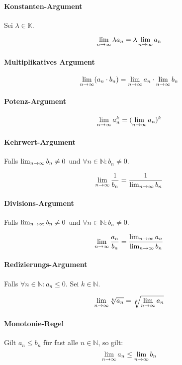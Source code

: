         \paragraph{Konstanten-Argument}
            Sei $ \lambda \in \mathbb{K} $.

            \[ \lim_{n \to \infty} \lambda a _ n = \lambda \lim_{n \to \infty} a _ n \]

        \paragraph{Multiplikatives Argument}
            \[ \lim_{n \to \infty} (a _ n \cdot b _ n) = \lim_{n \to \infty} a _ n \cdot \lim_{n \to \infty} b _ n \]

        \paragraph{Potenz-Argument}
            \[ \lim_{n \to \infty} a _ n ^ k = (\lim_{n \to \infty} a _ n) ^ k \]

        \paragraph{Kehrwert-Argument}
            Falls $ \lim_{n \to \infty} b _ n \neq 0 $ und $ \forall n \in \mathbb{N} : b _ n \neq 0 $.

            \[ \lim_{n \to \infty} \frac{1}{b _ n} = \frac{1}{\lim_{n \to \infty} b _ n} \]

        \paragraph{Divisions-Argument}
            Falls $ \lim_{n \to \infty} b _ n \neq 0 $ und $ \forall n \in \mathbb{N} : b _ n \neq 0 $.

            \[ \lim_{n \to \infty} \frac{a _ n}{b _ n} = \frac{\lim_{n \to \infty} a _ n}{\lim_{n \to \infty} b _ n} \]

        \paragraph{Redizierungs-Argument}
            Falls $ \forall n \in \mathbb{N} : a _ n \leq 0 $. Sei $ k \in \mathbb{N} $.

            \[ \lim_{n \to \infty} \sqrt[k]{a _ n} = \sqrt[k]{\lim_{n \to \infty} a _ n} \]

        \paragraph{Monotonie-Regel}
            Gilt $ a _ n \leq b _ n $ für fast alle $ n \in \mathbb{N} $, so gilt: \[ \lim_{n \to \infty} a _ n \leq \lim_{n \to \infty} b _ n \]

